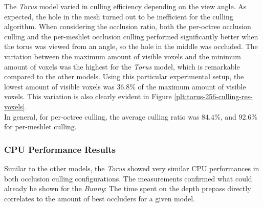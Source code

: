 
\noindent
The \emph{Torus} model varied in culling efficiency depending on the view angle. As expected, the hole 
in the mesh turned out to be inefficient for the culling algorithm. When considering the occlusion ratio, 
both the per-octree occlusion culling and the per-meshlet occlusion culling performed significantly better 
when the torus was viewed from an angle, so the hole in the middle was occluded. The variation between 
the maximum amount of visible voxels and the minimum amount of voxels was the highest for the \emph{Torus} 
model, which is remarkable compared to the other models. Using this particular experimental setup, the 
lowest amount of visible voxels was $36.8\%$ of the maximum amount of visible voxels. This variation is 
also clearly evident in Figure \ref{plt:torus-256-culling-res-voxels}. \\ 

\noindent
In general, for per-octree culling, the average culling ratio was $84.4\%$, and $92.6\%$ for per-meshlet culling. 

\subsubsection*{CPU Performance Results} \label{subsubsec-cpu-performance-results-torus}

Similar to the other models, the \emph{Torus} showed very similar \ac{CPU} performances in both 
occlusion culling configurations. The measurements confirmed what could already be shown for the 
\emph{Bunny}: The time spent on the depth prepass directly correlates to the amount of best occluders 
for a given model.


